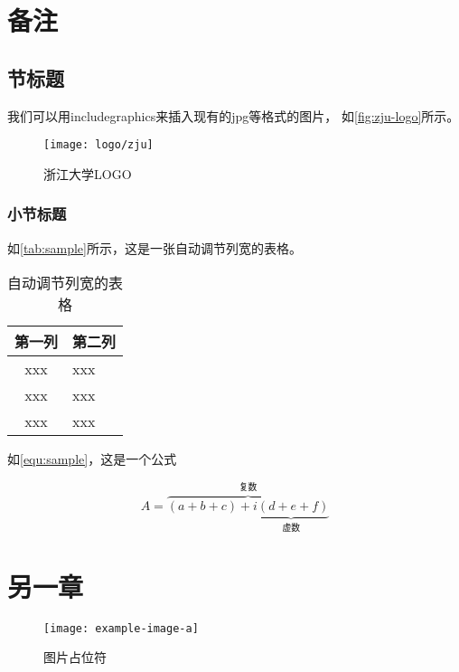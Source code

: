 
\chapter{备注}
\section{节标题}

我们可以用includegraphics来插入现有的jpg等格式的图片，
如\autoref{fig:zju-logo}所示。

\begin{figure}[htbp]
    \centering
    \texttt{[image: logo/zju]}
    \caption{\label{fig:zju-logo}浙江大学LOGO}
\end{figure}


\subsection{小节标题}


\par 如\autoref{tab:sample}所示，这是一张自动调节列宽的表格。

\begin{table}[htbp]
    \caption{\label{tab:sample}自动调节列宽的表格}
    \begin{tabularx}{\linewidth}{c|X<{\centering}}
        \hline
        第一列 & 第二列 \\ \hline
        xxx & xxx \\ \hline
        xxx & xxx \\ \hline
        xxx & xxx \\ \hline
    \end{tabularx}
\end{table}


\par 如\autoref{equ:sample}，这是一个公式

\begin{equation}
    \label{equ:sample}
    A=\overbrace{(a+b+c)+\underbrace{i(d+e+f)}_{\text{虚数}}}^{\text{复数}}
\end{equation}

\chapter{另一章}


\begin{figure}[htbp]
    \centering
    \texttt{[image: example-image-a]}
    \caption{\label{fig:fig-placeholder}图片占位符}
\end{figure}

